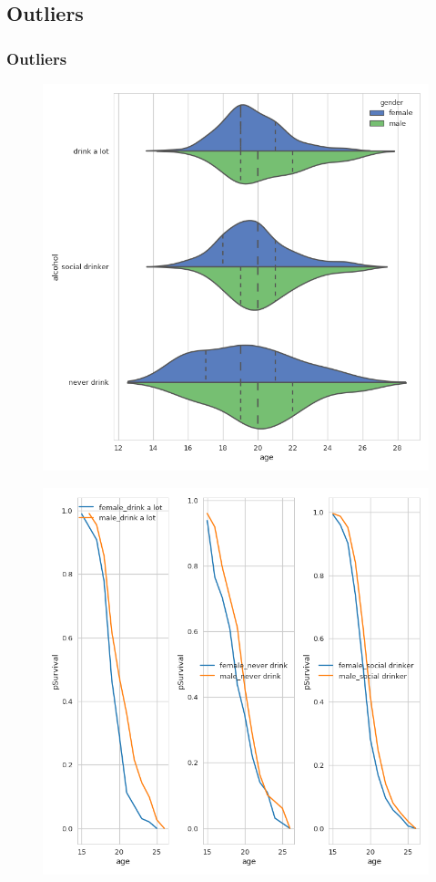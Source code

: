 \documentclass[8pt]{beamer}
\begin{document}
\subsection{Outliers}
\begin{frame}\frametitle{Outliers}
\begin{multicols}{2} 
 \begin{figure}
 \includegraphics[scale=0.2]{alcohol_dist_woo}
 \end{figure}
 \columnbreak
 \begin{figure}
 \includegraphics[scale=0.2]{alcohol_survival_woo}

\end{figure}
\end{multicols}
\end{frame}
\end{document}

